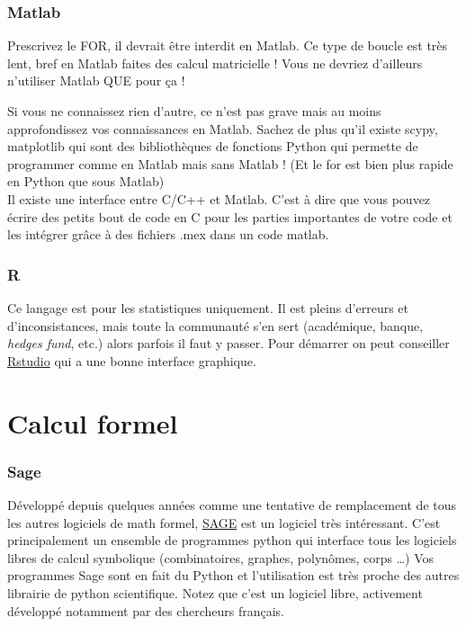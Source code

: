 

\subsubsection*{Matlab}

Prescrivez le FOR, il devrait être interdit en Matlab. Ce type de boucle est très lent, bref en Matlab 
faites des calcul matricielle ! Vous ne devriez d'ailleurs n'utiliser Matlab QUE pour ça !

Si vous ne connaissez rien d'autre, ce n'est pas grave mais au moins approfondissez vos connaissances 
en Matlab.  Sachez de plus qu'il existe scypy, matplotlib  qui sont des bibliothèques de fonctions Python 
qui permette de programmer comme en Matlab mais sans Matlab ! (Et le for est bien plus rapide 
en Python que sous Matlab)\\

Il existe une interface entre C/C++ et Matlab. C'est à dire que vous pouvez écrire des petits bout de code en C
pour les parties importantes de votre code et les intégrer grâce à des fichiers .mex dans un code matlab.


\subsubsection*{R} Ce langage est pour les statistiques uniquement. 
Il est pleins d'erreurs et d'inconsistances, mais
toute la communauté s'en sert (académique, banque, \textit{hedges fund}, etc.) alors parfois 
il faut y passer. 
Pour démarrer on peut conseiller \href{http://www.rstudio.com/}{Rstudio} qui a une bonne interface graphique.

\section{Calcul formel}


\subsubsection*{Sage}
Développé depuis quelques années comme une tentative de remplacement de tous les
autres logiciels de math formel,  \href{http://www.sagemath.org/}{SAGE} est un logiciel très intéressant.
C'est principalement un ensemble de programmes python qui interface tous les logiciels
libres de calcul symbolique (combinatoires, graphes, polynômes, corps \dots)
Vos programmes Sage sont en fait du Python et l'utilisation est très proche des 
autres librairie de python scientifique.
Notez que c'est un logiciel libre, activement développé notamment par des chercheurs français.



